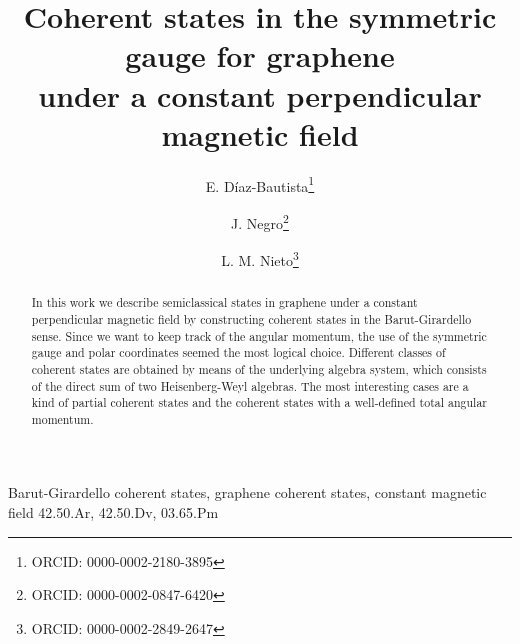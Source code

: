 \documentclass[aps,showpacs,showkeys]{revtex4}
\begin{document}
\title{Coherent states in the symmetric gauge for graphene\\ under a constant perpendicular magnetic field}

\author{E. D\'iaz-Bautista\footnote{ORCID: 0000-0002-2180-3895}}
\author{J. Negro\footnote{ORCID: 0000-0002-0847-6420}}
\author{L. M. Nieto\footnote{ORCID: 0000-0002-2849-2647}}


\begin{abstract}
	In this work we describe semiclassical states in graphene under a constant perpendicular magnetic field by constructing coherent states in the Barut-Girardello sense. Since we want to keep track of the angular momentum, the use of the symmetric gauge and polar coordinates seemed the most logical choice. Different classes of coherent states are obtained by means of the underlying algebra system, which consists of the direct sum of two Heisenberg-Weyl algebras. The most interesting cases are a kind of partial coherent states and the coherent states with a well-defined total angular momentum.
\end{abstract}


\keywords
 {Barut-Girardello coherent states, graphene coherent states, constant magnetic field}
\pacs
 {42.50.Ar, 42.50.Dv, 03.65.Pm}
\maketitle
\end{document}
